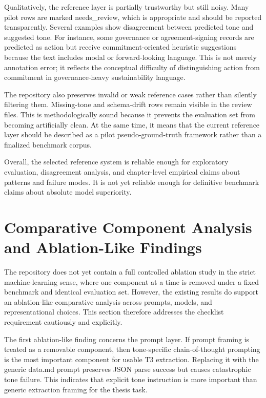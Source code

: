 Qualitatively, the reference layer is partially trustworthy but still noisy. Many pilot rows are marked needs\_review, which is appropriate and should be reported transparently. Several examples show disagreement between predicted tone and suggested tone. For instance, some governance or agreement-signing records are predicted as action but receive commitment-oriented heuristic suggestions because the text includes modal or forward-looking language. This is not merely annotation error; it reflects the conceptual difficulty of distinguishing action from commitment in governance-heavy sustainability language.

The repository also preserves invalid or weak reference cases rather than silently filtering them. Missing-tone and schema-drift rows remain visible in the review files. This is methodologically sound because it prevents the evaluation set from becoming artificially clean. At the same time, it means that the current reference layer should be described as a pilot pseudo-ground-truth framework rather than a finalized benchmark corpus.

Overall, the selected reference system is reliable enough for exploratory evaluation, disagreement analysis, and chapter-level empirical claims about patterns and failure modes. It is not yet reliable enough for definitive benchmark claims about absolute model superiority.
\section{Comparative Component Analysis and Ablation-Like Findings}

The repository does not yet contain a full controlled ablation study in the strict machine-learning sense, where one component at a time is removed under a fixed benchmark and identical evaluation set. However, the existing results do support an ablation-like comparative analysis across prompts, models, and representational choices. This section therefore addresses the checklist requirement cautiously and explicitly.

The first ablation-like finding concerns the prompt layer. If prompt framing is treated as a removable component, then tone-specific chain-of-thought prompting is the most important component for usable T3 extraction. Replacing it with the generic data.md prompt preserves JSON parse success but causes catastrophic tone failure. This indicates that explicit tone instruction is more important than generic extraction framing for the thesis task.

